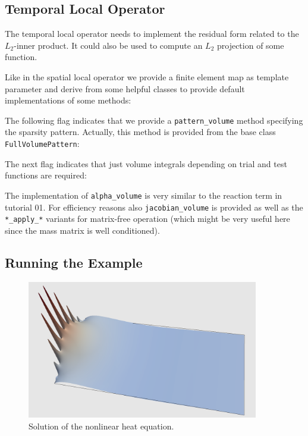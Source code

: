 \documentclass[a4paper,12pt]{article}
\begin{document}
\subsection{Temporal Local Operator}

The temporal local operator needs to implement the
residual form related to the $L_2$-inner product. It could also
be used to compute an $L_2$ projection of some function.

Like in the spatial local operator we provide a finite element
map as template parameter and derive from some helpful
classes to provide default implementations of some methods:


The following flag indicates that we provide a \lstinline{pattern_volume} method
specifying the sparsity pattern. Actually, this method is provided from the base class
\lstinline{FullVolumePattern}:


The next flag indicates that just volume integrals depending
on trial and test functions are required:


The implementation of \lstinline{alpha_volume}
is very similar to the reaction term in tutorial 01. For efficiency reasons
also \lstinline{jacobian_volume} is provided as well as the
\lstinline{*_apply_*} variants for matrix-free operation (which might
be very useful here since the mass matrix is well conditioned).

\subsection{Running the Example}

\begin{figure}
\begin{center}
\includegraphics[width=0.9\textwidth]{warp}
\end{center}
\caption{Solution of the nonlinear heat equation.}
\label{fig:Bunt}
\end{figure}
\end{document}
